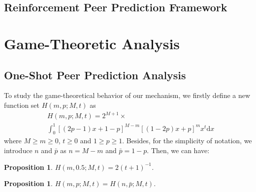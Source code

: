 \documentclass{article}
\newtheorem{proposition}[theorem]{Proposition}
\begin{document}
\subsection{Reinforcement Peer Prediction Framework}

\section{Game-Theoretic Analysis}
\subsection{One-Shot Peer Prediction Analysis}
To study the game-theoretical behavior of our mechanism, we firstly define a new function set $H(m,p;M,t)$ as
\begin{align}
&H(m,p;M,t)=2^{M+1}\times \label{Hfunction}\\
&\int_{0}^{1}[(2p-1)x+1-p]^{M-m}[(1-2p)x+p]^{m}x^t\mathrm{d}x \nonumber
\end{align}
where $M\geq m\geq 0$, $t\geq 0$ and $1\geq p\geq 1$.
Besides, for the simplicity of notation, we introduce $n$ and $\bar{p}$ as $n=M-m$ and $\bar{p}=1-p$.
Then, we can have:
\begin{proposition}
\label{MidPoint}
$H(m,0.5;M,t) = 2(t+1)^{-1}$.
\end{proposition}
\begin{proposition}
\label{Symmetry}
$H(m,p;M,t) = H(n, \bar{p};M,t)$.
\end{proposition}
\end{document}
